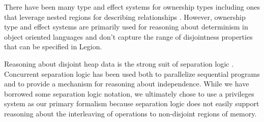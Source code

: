 There have been many type and effect systems for ownership types
\cite{Boyapati03} including ones that leverage nested regions for describing
relationships \cite{Clarke02,Cameron07}.  However, ownership type and effect systems
are primarily used for reasoning about determinism in object oriented languages and
don't capture the range of disjointness properties that can be specified in Legion.

Reasoning about disjoint heap data is the strong suit of separation logic \cite{Reynolds02}.  
Concurrent separation logic\cite{Brookes04} has been 
used both to parallelize sequential programs\cite{Raza09,Gotsman07} and to provide 
a mechanism for reasoning about independence\cite{Hayman06}.
While we have borrowed some separation logic notation, we ultimately chose to use a 
privileges system as our primary formalism because separation logic does not easily
support reasoning about the interleaving of operations to non-disjoint regions of memory.





